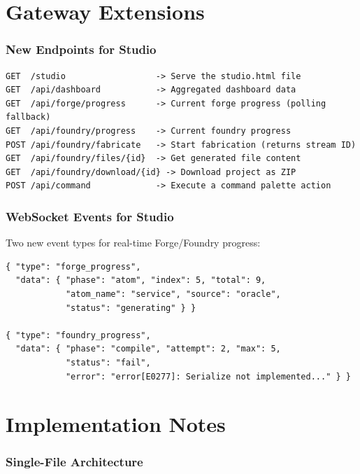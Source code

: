 \documentclass[11pt,a4paper,twoside]{article}
\begin{document}
\part{Gateway Extensions}\label{part:gateway}

\section{New Endpoints for Studio}\label{sec:endpoints}

\begin{lstlisting}[title={Studio-Specific Endpoints}]
GET  /studio                  -> Serve the studio.html file
GET  /api/dashboard           -> Aggregated dashboard data
GET  /api/forge/progress      -> Current forge progress (polling fallback)
GET  /api/foundry/progress    -> Current foundry progress
POST /api/foundry/fabricate   -> Start fabrication (returns stream ID)
GET  /api/foundry/files/{id}  -> Get generated file content
GET  /api/foundry/download/{id} -> Download project as ZIP
POST /api/command             -> Execute a command palette action
\end{lstlisting}

\section{WebSocket Events for Studio}\label{sec:wsevents}

Two new event types for real-time Forge/Foundry progress:

\begin{lstlisting}
{ "type": "forge_progress",
  "data": { "phase": "atom", "index": 5, "total": 9,
            "atom_name": "service", "source": "oracle",
            "status": "generating" } }

{ "type": "foundry_progress",
  "data": { "phase": "compile", "attempt": 2, "max": 5,
            "status": "fail",
            "error": "error[E0277]: Serialize not implemented..." } }
\end{lstlisting}


\part{Implementation Notes}\label{part:implnotes}

\section{Single-File Architecture}\label{sec:singlefile}
\end{document}
